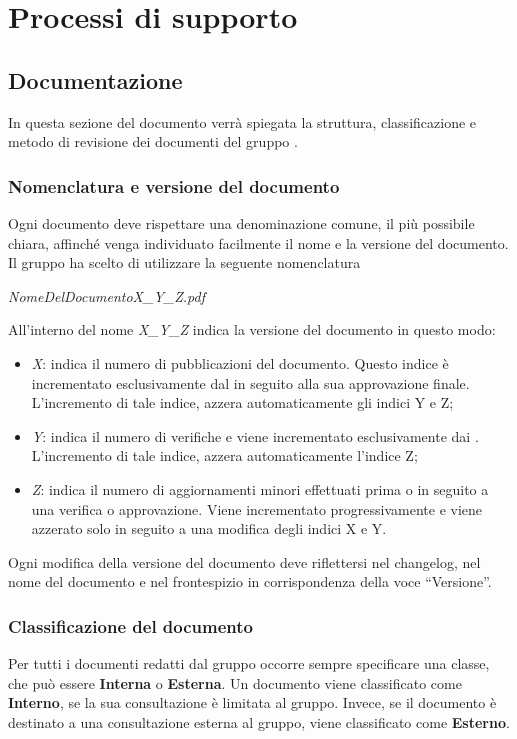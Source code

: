 \newpage

\section{Processi di supporto}

	\subsection{Documentazione}
	In questa sezione del documento verrà spiegata la struttura, classificazione e metodo di revisione dei documenti del gruppo \textit{\gruppo}.
	
		\subsubsection{Nomenclatura e versione del documento}
		Ogni documento deve rispettare una denominazione comune, il più possibile chiara, affinché venga individuato facilmente il nome e la versione del documento. 
		Il gruppo ha scelto di utilizzare la seguente nomenclatura 
		\begin{center}
			\textit{NomeDelDocumentoX\_Y\_Z.pdf}
		\end{center}
		All’interno del nome \textit{X\_Y\_Z} indica la versione del documento in questo modo:
		\begin{itemize}
			\item \textit{X}: indica il numero di pubblicazioni del documento. Questo indice è incrementato esclusivamente dal \textit{\RdP} in seguito alla sua approvazione finale. L’incremento di tale indice, azzera automaticamente gli indici Y e Z;
			\item \textit{Y}: indica il numero di verifiche e viene incrementato esclusivamente dai \textit{\Vers}. L’incremento di tale indice, azzera automaticamente l'indice Z;
			\item \textit{Z}: indica il numero di aggiornamenti minori effettuati prima o in seguito a una verifica o approvazione. Viene incrementato progressivamente e viene azzerato solo in seguito a una modifica degli indici X e Y.
		\end{itemize}
		Ogni modifica della versione del documento deve riflettersi nel changelog, nel nome del documento e nel frontespizio in corrispondenza della voce “Versione”.
	
		\subsubsection{Classificazione del documento}
		Per tutti i documenti redatti dal gruppo occorre sempre specificare una classe, che può essere \textbf{Interna} o \textbf{Esterna}.
		Un documento viene classificato come \textbf{Interno}, se la sua consultazione è limitata al gruppo. Invece, se il documento è destinato a una consultazione esterna al gruppo, viene classificato come \textbf{Esterno}.
	

